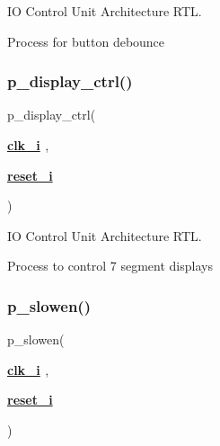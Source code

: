 IO Control Unit Architecture R\+TL. 

Process for button debounce \mbox{\label{classio__ctrl_1_1rtl_a9adae6696d8563868e95204ecd77e739}} 
\subsubsection{\texorpdfstring{p\+\_\+display\+\_\+ctrl()}{p\_display\_ctrl()}}
{\footnotesize\ttfamily  {\bfseries \textcolor{vhdlchar}{ }} p\+\_\+display\+\_\+ctrl(\begin{DoxyParamCaption}\item[{}]{{\bfseries {\bfseries \hyperlink{classio__ctrl_abe949478e3f8aad0a6aeb1842fa6c608}{clk\+\_\+i}} \textcolor{vhdlchar}{ }} {\em } ,  }\item[{}]{{\bfseries {\bfseries \hyperlink{classio__ctrl_a55da7e76960757f8c6842e86a28ee7be}{reset\+\_\+i}} \textcolor{vhdlchar}{ }} {\em } }\end{DoxyParamCaption})\hspace{0.3cm}{\ttfamily [Process]}}



IO Control Unit Architecture R\+TL. 

Process to control 7 segment displays \mbox{\label{classio__ctrl_1_1rtl_ae82c89fe12aec7f3a8a04e832dd5cc0e}} 
\subsubsection{\texorpdfstring{p\+\_\+slowen()}{p\_slowen()}}
{\footnotesize\ttfamily  {\bfseries \textcolor{vhdlchar}{ }} p\+\_\+slowen(\begin{DoxyParamCaption}\item[{}]{{\bfseries {\bfseries \hyperlink{classio__ctrl_abe949478e3f8aad0a6aeb1842fa6c608}{clk\+\_\+i}} \textcolor{vhdlchar}{ }} {\em } ,  }\item[{}]{{\bfseries {\bfseries \hyperlink{classio__ctrl_a55da7e76960757f8c6842e86a28ee7be}{reset\+\_\+i}} \textcolor{vhdlchar}{ }} {\em } }\end{DoxyParamCaption})\hspace{0.3cm}{\ttfamily [Process]}}




